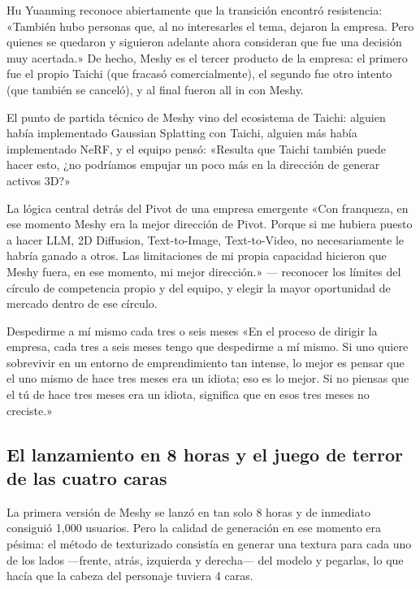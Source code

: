 \documentclass[a4paper]{article}
\begin{document}
Hu Yuanming reconoce abiertamente que la transición encontró resistencia: «También hubo personas que, al no interesarles el tema, dejaron la empresa. Pero quienes se quedaron y siguieron adelante ahora consideran que fue una decisión muy acertada.» De hecho, Meshy es el tercer producto de la empresa: el primero fue el propio Taichi (que fracasó comercialmente), el segundo fue otro intento (que también se canceló), y al final fueron all in con Meshy.

El punto de partida técnico de Meshy vino del ecosistema de Taichi: alguien había implementado Gaussian Splatting con Taichi, alguien más había implementado NeRF, y el equipo pensó: «Resulta que Taichi también puede hacer esto, ¿no podríamos empujar un poco más en la dirección de generar activos 3D?»

\begin{importantbox}{La lógica central detrás del Pivot de una empresa emergente}
«Con franqueza, en ese momento Meshy era la mejor dirección de Pivot. Porque si me hubiera puesto a hacer LLM, 2D Diffusion, Text-to-Image, Text-to-Video, no necesariamente le habría ganado a otros. Las limitaciones de mi propia capacidad hicieron que Meshy fuera, en ese momento, mi mejor dirección.» — reconocer los límites del círculo de competencia propio y del equipo, y elegir la mayor oportunidad de mercado dentro de ese círculo.
\end{importantbox}

\begin{importantbox}{Despedirme a mí mismo cada tres o seis meses}
«En el proceso de dirigir la empresa, cada tres a seis meses tengo que despedirme a mí mismo. Si uno quiere sobrevivir en un entorno de emprendimiento tan intense, lo mejor es pensar que el uno mismo de hace tres meses era un idiota; eso es lo mejor. Si no piensas que el tú de hace tres meses era un idiota, significa que en esos tres meses no creciste.»
\end{importantbox}

\subsection{El lanzamiento en 8 horas y el juego de terror de las cuatro caras}

La primera versión de Meshy se lanzó en tan solo 8 horas y de inmediato consiguió 1,000 usuarios. Pero la calidad de generación en ese momento era pésima: el método de texturizado consistía en generar una textura para cada uno de los lados —frente, atrás, izquierda y derecha— del modelo y pegarlas, lo que hacía que la cabeza del personaje tuviera 4 caras.
\end{document}
